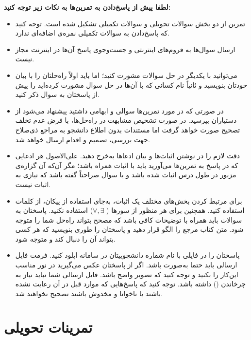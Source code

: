 \documentclass{scribe-or}
\begin{document}

\textbf{لطفا پیش از پاسخ‌دادن به تمرین‌ها به نکات زیر توجه کنید: \\}	
{\scriptsize \begin{itemize}
	\item
تمرین از دو بخش سوالات تحویلی و سوالات تکمیلی تشکیل شده است. توجه کنید که پاسخ‌دادن به سوالات تکمیلی نمره‌ی اضافه‌ای ندارد.
	\item 
	ارسال سوال‌ها به فروم‌های اینترنتی و جست‌و‌جوی پاسخ آن‌ها در اینترنت مجاز نیست.
	\item 
	می‌توانید با یکدیگر در حل سوالات مشورت کنید؛ اما باید اولاً راه‌حلتان را با بیان خودتان بنویسید و ثانیاً نام کسانی که با آن‌ها در حل سوال مشورت کرده‌اید را پیش از پاسختان به سوال ذکر کنید.
	\item 
	در صورتی که در مورد تمرین‌ها سوالی و ابهامی داشتید پیشنهاد می‌شود از دستیاران بپرسید.
	در صورت تشخیص مشابهت در راه‌حل‌ها، با فرض عدم تخلف تصحیح صورت خواهد گرفت اما مستندات بدون اطلاع دانشجو به مراجع ذی‌صلاح جهت بررسی، تصمیم و اقدام ارسال خواهد شد.
	
	\item
	دقت لازم را در نوشتن اثبات‌ها و بیان ادعاها به‌خرج دهید. علی‌الاصول هر ادعایی که در پاسخ به تمرین‌ها می‌آورید باید با اثبات همراه باشد؛ مگر آن‌که آن گزاره‌ی مزبور در طول درس اثبات شده باشد و یا سوال صراحتاً گفته باشد که نیازی به اثبات نیست.
	\item 
	برای مرتبط کردن بخش‌های مختلف یک اثبات، به‌جای استفاده از پیکان‌، از کلمات استفاده کنید. همچنین برای هر منظور از سورها (
	$\forall,\exists$) 
	استفاده نکنید. 
	 پاسختان به سوالات باید همراه با توضیحات کافی باشد که مصحح بتواند راه‌حل شما را متوجه شود. متن کتاب مرجع را الگو قرار دهید و پاسختان را طوری بنویسید که هر کسی بتواند آن را دنبال کند و متوجه شود.
	
	 \item 
	پاسختان را در فایلی با نام شماره دانشجوییتان در سامانه اپلود کنید. فرمت فایل ارسالی باید حتما به‌صورت 
	باشد. اگر از پاسختان عکس می‌گیرید در نور مناسب این‌کار را بکنید و توجه کنید که تصویر واضح باشد. فایل ارسالی شما نباید نیاز به چرخاندن () داشته باشد. توجه کنید که پاسخ‌هایی که موارد قبل در آن رعایت نشده باشند یا ناخوانا و مخدوش باشند تصحیح نخواهند شد.
\end{itemize}}
\pagebreak
\section*{تمرینات تحویلی}
\end{document}
